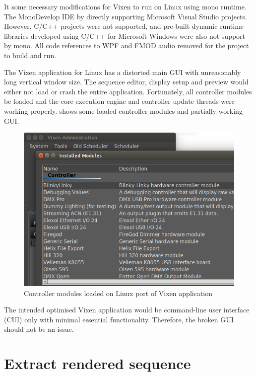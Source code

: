 It  some necessary modifications for Vixen to run on Linux using mono runtime. The MonoDevelop IDE \cite{monodevelop}  by directly supporting Microsoft Visual Studio projects. However, C/C++ projects were not supported, and pre-built dynamic runtime libraries developed using C/C++ for Microsoft Windows were also not support by mono. All code references to WPF and FMOD audio  removed for the project to build and run.

The  Vixen application for Linux has a distorted main GUI with unreasonably long vertical window size. The sequence editor, display setup and preview would either not load or crash the entire application. Fortunately, all controller modules  be loaded and the core execution engine and controller update threads were working properly.  shows some loaded controller modules and partially working GUI.

\begin{figure}[t]
  \centering
  \includegraphics[width=0.8\columnwidth]{Figs/vixen_linux_controllers.png}
  \caption{\footnotesize Controller modules loaded on Linux port of Vixen application}
  \label{fig:vixen_linux_main}
\end{figure}

The intended optimised Vixen application would be command-line user interface (CUI) only with minimal essential functionality. Therefore, the broken GUI should not be an issue.

\section{Extract rendered sequence}

